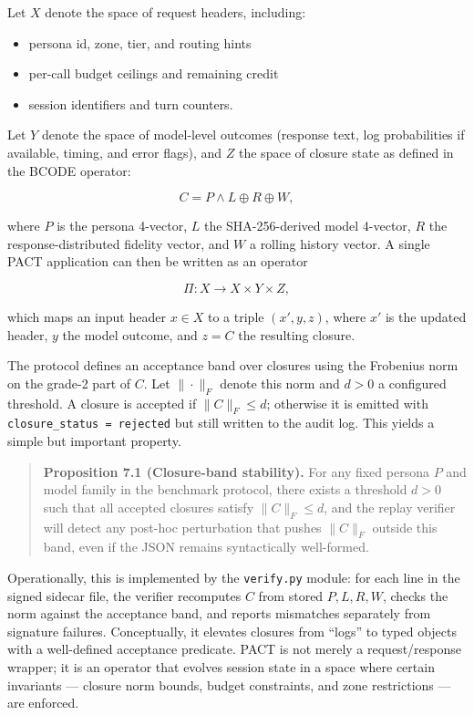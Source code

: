 Let \(X\) denote the space of request headers, including:

\begin{itemize}
\tightlist
\item
  persona id, zone, tier, and routing hints
\item
  per-call budget ceilings and remaining credit
\item
  session identifiers and turn counters.
\end{itemize}

Let \(Y\) denote the space of model-level outcomes (response text, log
probabilities if available, timing, and error flags), and \(Z\) the
space of closure state as defined in the BCODE operator:

\[
C = P \wedge L \oplus R \oplus W,
\]

where \(P\) is the persona 4-vector, \(L\) the SHA-256-derived model
4-vector, \(R\) the response-distributed fidelity vector, and \(W\) a
rolling history vector. A single PACT application can then be written as
an operator

\[
\Pi : X \to X \times Y \times Z,
\]

which maps an input header \(x \in X\) to a triple \((x', y, z)\), where
\(x'\) is the updated header, \(y\) the model outcome, and \(z = C\) the
resulting closure.

The protocol defines an acceptance band over closures using the
Frobenius norm on the grade-2 part of \(C\). Let \(\|\cdot\|_F\) denote
this norm and \(d > 0\) a configured threshold. A closure is accepted if
\(\|C\|_F \le d\); otherwise it is emitted with
\texttt{closure\_status\ =\ rejected} but still written to the audit
log. This yields a simple but important property.

\begin{quote}
\textbf{Proposition 7.1 (Closure-band stability).} For any fixed persona
\(P\) and model family in the benchmark protocol, there exists a
threshold \(d > 0\) such that all accepted closures satisfy
\(\|C\|_F \le d\), and the replay verifier will detect any post-hoc
perturbation that pushes \(\|C\|_F\) outside this band, even if the JSON
remains syntactically well-formed.
\end{quote}

Operationally, this is implemented by the \texttt{verify.py} module: for
each line in the signed sidecar file, the verifier recomputes \(C\) from
stored \(P, L, R, W\), checks the norm against the acceptance band, and
reports mismatches separately from signature failures. Conceptually, it
elevates closures from ``logs'' to typed objects with a well-defined
acceptance predicate. PACT is not merely a request/response wrapper; it
is an operator that evolves session state in a space where certain
invariants --- closure norm bounds, budget constraints, and zone
restrictions --- are enforced.

